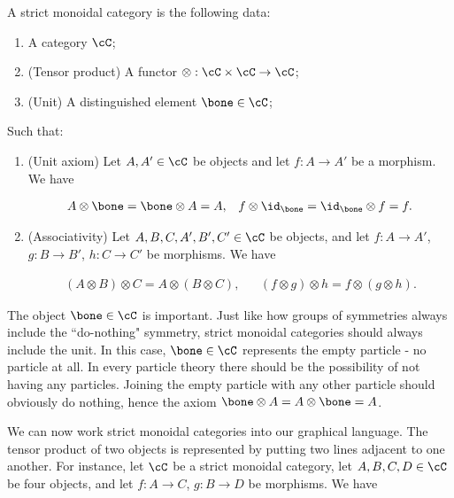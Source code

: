 \begin{defn} A strict monoidal category is the following data:

\begin{enumerate}
\item A category $\cC$;
\item (Tensor product) A functor $\otimes: \cC \times \cC \to \cC$;
\item (Unit) A distinguished element $\bone\in \cC$;
\end{enumerate}

Such that:

\begin{enumerate}
\item (Unit axiom) Let $A,A'\in \cC$ be objects and let $f:A\to A'$ be a morphism. We have

\begin{align*}
A\otimes \bone = \bone \otimes A =A, && f\otimes \id_{\bone} = \id_{\bone}\otimes f = f.
\end{align*}

\item (Associativity) Let $A,B,C,A',B',C'\in\cC$ be objects, and let $f:A\to A'$, $g:B\to B'$, $h:C\to C'$ be morphisms. We have

\begin{align*}
(A\otimes B)\otimes C = A\otimes (B\otimes C), && (f\otimes g)\otimes h = f\otimes (g\otimes h).
\end{align*}
\end{enumerate}


\end{defn}

\begin{rem}
The object $\bone\in \cC$ is important. Just like how groups of symmetries always include the ``do-nothing" symmetry, strict monoidal categories should always include the unit. In this case, $\bone\in \cC$ represents the empty particle - no particle at all. In every particle theory there should be the possibility of not having any particles. Joining the empty particle with any other particle should obviously do nothing, hence the axiom $\bone\otimes A = A\otimes \bone = A$.
\end{rem}

We can now work strict monoidal categories into our graphical language. The tensor product of two objects is represented by putting two lines adjacent to one another. For instance, let $\cC$ be a strict monoidal category, let $A,B,C,D\in \cC$ be four objects, and let $f:A\to C$, $g:B\to D$ be morphisms. We have

